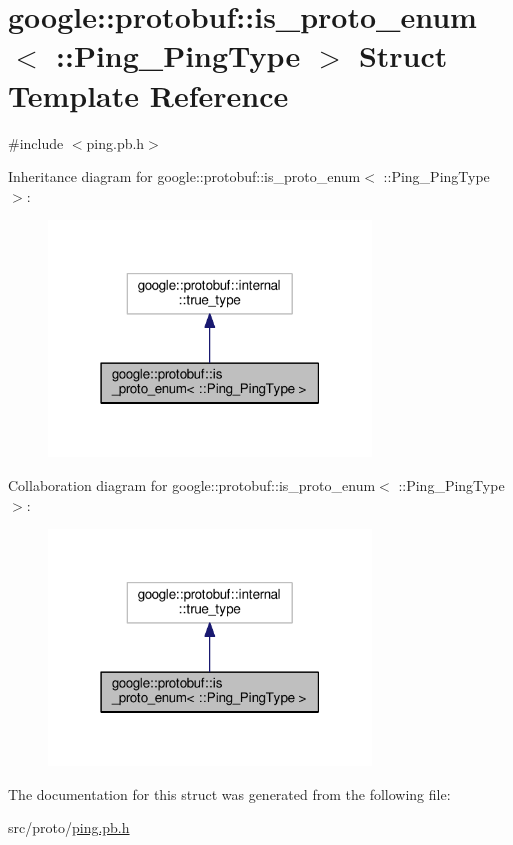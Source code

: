 \hypertarget{structgoogle_1_1protobuf_1_1is__proto__enum_3_01_1_1_ping___ping_type_01_4}{}\section{google\+:\+:protobuf\+:\+:is\+\_\+proto\+\_\+enum$<$ \+:\+:Ping\+\_\+\+Ping\+Type $>$ Struct Template Reference}
\label{structgoogle_1_1protobuf_1_1is__proto__enum_3_01_1_1_ping___ping_type_01_4}


{\ttfamily \#include $<$ping.\+pb.\+h$>$}



Inheritance diagram for google\+:\+:protobuf\+:\+:is\+\_\+proto\+\_\+enum$<$ \+:\+:Ping\+\_\+\+Ping\+Type $>$\+:\nopagebreak
\begin{figure}[H]
\begin{center}
\leavevmode
\includegraphics[width=243pt]{structgoogle_1_1protobuf_1_1is__proto__enum_3_01_1_1_ping___ping_type_01_4__inherit__graph}
\end{center}
\end{figure}


Collaboration diagram for google\+:\+:protobuf\+:\+:is\+\_\+proto\+\_\+enum$<$ \+:\+:Ping\+\_\+\+Ping\+Type $>$\+:\nopagebreak
\begin{figure}[H]
\begin{center}
\leavevmode
\includegraphics[width=243pt]{structgoogle_1_1protobuf_1_1is__proto__enum_3_01_1_1_ping___ping_type_01_4__coll__graph}
\end{center}
\end{figure}


The documentation for this struct was generated from the following file\+:\begin{DoxyCompactItemize}
\item 
src/proto/\hyperlink{ping_8pb_8h}{ping.\+pb.\+h}\end{DoxyCompactItemize}
